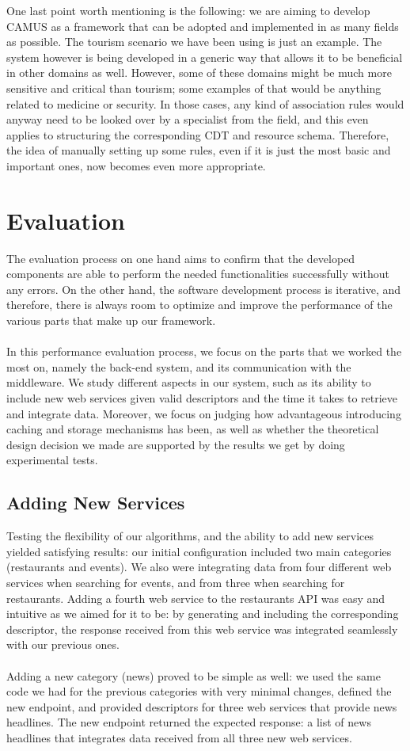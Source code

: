 \begin{itemize}
One last point worth mentioning is the following: we are aiming to develop CAMUS as a framework that can be adopted and implemented in as many fields as possible. The tourism scenario we have been using is just an example. The system however is being developed in a generic way that allows it to be beneficial in other domains as well. However, some of these domains might be much more sensitive and critical than tourism; some examples of that would be anything related to medicine or security. In those cases, any kind of association rules would anyway need to be looked over by a specialist from the field, and this even applies to structuring the corresponding CDT and resource schema. Therefore, the idea of manually setting up some rules, even if it is just the most basic and important ones, now becomes even more appropriate.
\end{itemize}
\pagebreak
\section{Evaluation}
The evaluation process on one hand aims to confirm that the developed components are able to perform the needed functionalities successfully without any errors. On the other hand, the software development process is iterative, and therefore, there is always room to optimize and improve the performance of the various parts that make up our framework.\\\\
In this performance evaluation process, we focus on the parts that we worked the most on, namely the back-end system, and its communication with the middleware. We study different aspects in our system, such as its ability to include new web services given valid descriptors and the time it takes to retrieve and integrate data. Moreover, we focus on judging how advantageous introducing caching and storage mechanisms has been, as well as whether the theoretical design decision we made are supported by the results we get by doing experimental tests.
\subsection{Adding New Services}
Testing the flexibility of our algorithms, and the ability to add new services yielded satisfying results: our initial configuration included two main categories (restaurants and events). We also were integrating data from four different web services when searching for events, and from three when searching for restaurants. Adding a fourth web service to the restaurants API was easy and intuitive as we aimed for it to be: by generating and including the corresponding descriptor, the response received from this web service was integrated seamlessly with our previous ones.\\\\
Adding a new category (news) proved to be simple as well: we used the same code we had for the previous categories with very minimal changes, defined the new endpoint, and provided descriptors for three web services that provide news headlines. The new endpoint returned the expected response: a list of news headlines that integrates data received from all three new web services.

